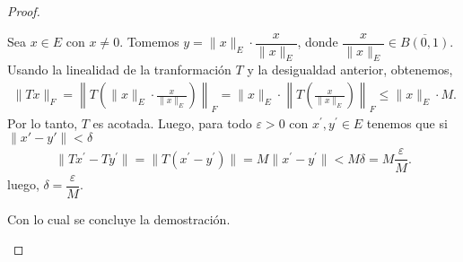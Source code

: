 \begin{proof}
\begin{itemize}
    Sea $x \in E$ con $x \neq 0$. Tomemos $y = \|x\|_E \cdot \dfrac{x}{\|x\|_E}$, donde $ \dfrac{x}{\|x\|_E}\in \overline{B(0,1)}$. Usando la linealidad de la tranformación $T$ y la desigualdad anterior, obtenemos,
    \begin{align*}
      \|T x\|_F = \left\| T\left( \|x\|_E \cdot \frac{x}{\|x\|_E} \right) \right\|_F = \|x\|_E \cdot \left\| T\left( \frac{x}{\|x\|_E} \right) \right\|_F \leq \|x\|_E \cdot M 
    .\end{align*}
    Por lo tanto, $T$ es acotada. Luego, para todo $\varepsilon>0$ con $x^{\prime}, y^{\prime}\in E$ tenemos que si $\|x'-y'\|<\delta$
    \begin{align*}
        \|Tx^{\prime}-Ty^{\prime}\|=\|T(x^{\prime}-y^{\prime})\|=M\|x^{\prime}-y^{\prime} \|<M\delta=M\dfrac{\varepsilon}{M}
    .\end{align*}
    luego, $\delta= \dfrac{\varepsilon}{M}$.


    Con lo cual se concluye la demostración.

\end{itemize}

   


\end{proof}